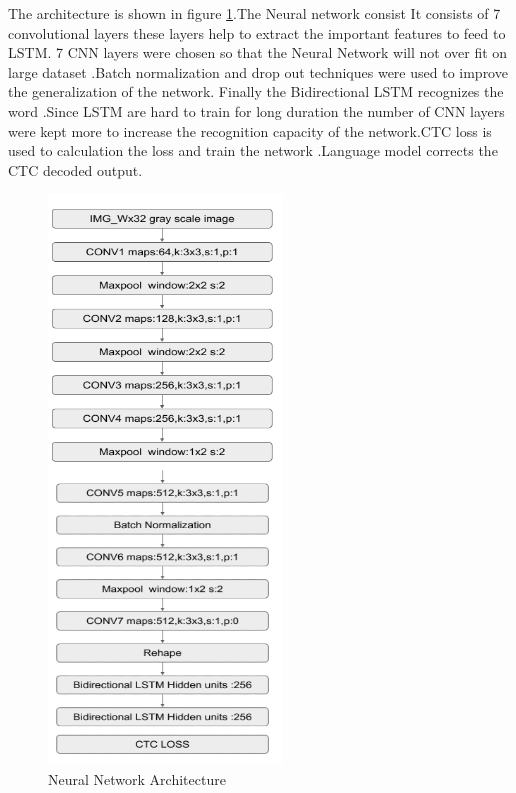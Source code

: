 The architecture is shown in figure \ref{fig:arch}.The Neural network consist It consists of 7
convolutional layers these layers help to extract the important features to feed to LSTM. 7 CNN layers were
chosen so that the Neural Network will not over fit on large dataset .Batch normalization and drop out
techniques were used to improve the generalization of the network. Finally the Bidirectional LSTM recognizes
the word .Since LSTM are hard to train for long duration the number of CNN layers were kept more to increase
the recognition capacity of the network.CTC loss is used to calculation the loss and train the network
.Language model corrects the CTC decoded output.

\begin{figure}[h]
\centering
\includegraphics{Figures/arch.png}
\caption{Neural Network Architecture}
\label{fig:arch}
\end{figure}
